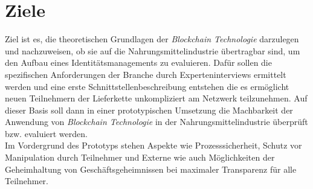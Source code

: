 \section{Ziele}

Ziel ist es, die theoretischen Grundlagen der \textit{Blockchain Technologie} darzulegen und nachzuweisen, ob sie auf die Nahrungsmittelindustrie übertragbar sind, um den Aufbau eines Identitätsmanagements zu evaluieren. Dafür sollen die spezifischen Anforderungen der Branche durch Experteninterviews ermittelt werden und eine erste Schnittstellenbeschreibung entstehen die es ermöglicht neuen Teilnehmern der Lieferkette unkompliziert am Netzwerk teilzunehmen. Auf dieser Basis soll dann in einer prototypischen Umsetzung die Machbarkeit der Anwendung von \textit{Blockchain Technologie} in der Nahrungsmittelindustrie überprüft bzw. evaluiert werden.\\

Im Vordergrund des Prototyps stehen Aspekte wie Prozesssicherheit, Schutz vor Manipulation durch Teilnehmer und Externe wie auch Möglichkeiten der Geheimhaltung von Geschäftsgeheimnissen bei maximaler Transparenz für alle Teilnehmer.\\


\newpage
